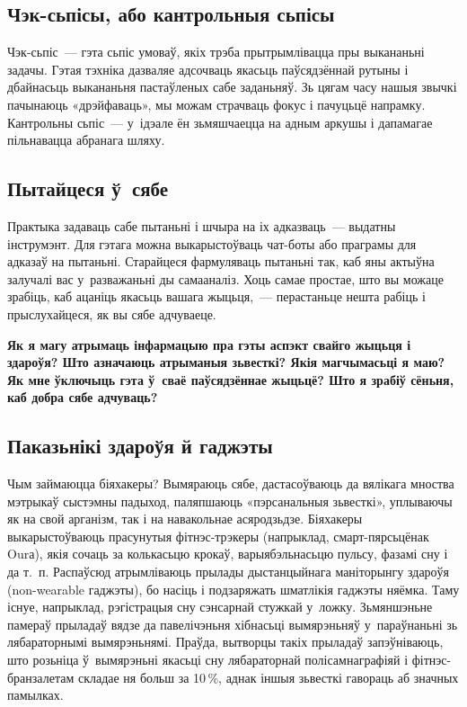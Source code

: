 \subsection*{Чэк-сьпісы, або кантрольныя сьпісы}

Чэк-сьпіс~--- гэта сьпіс умоваў, якіх трэба прытрымлівацца пры выкананьні задачы. Гэтая тэхніка дазваляе адсочваць якасьць паўсядзённай рутыны і дбайнасьць выкананьня пастаўленых сабе заданьняў. Зь цягам часу нашыя звычкі пачынаюць «дрэйфаваць», мы можам страчваць фокус і пачуцьцё напрамку. Кантрольны сьпіс~--- у~ідэале ён зьмяшчаецца на адным аркушы і дапамагае пільнавацца абранага шляху.

\subsection*{Пытайцеся ў~сябе}

Практыка задаваць сабе пытаньні і шчыра на іх адказваць~--- выдатны інструмэнт. Для гэтага можна выкарыстоўваць чат-боты або праграмы для адказаў на пытаньні. Старайцеся фармуляваць пытаньні так, каб яны актыўна залучалі вас у~разважаньні ды самааналіз. Хоць самае простае, што вы можаце зрабіць, каб ацаніць якасьць вашага жыцьця,~--- перастаньце нешта рабіць і прыслухайцеся, як вы сябе адчуваеце. 

\textbf{Як я магу атрымаць інфармацыю пра гэты аспэкт свайго жыцьця і здароўя? Што азначаюць атрыманыя зьвесткі? Якія магчымасьці я маю? Як мне ўключыць гэта ў~сваё паўсядзённае жыцьцё? Што я зрабіў сёньня, каб добра сябе адчуваць?}

\subsection*{Паказьнікі здароўя й гаджэты}

Чым займаюцца біяхакеры? Вымяраюць сябе, дастасоўваюць да вялікага мноства мэтрыкаў сыстэмны падыход, паляпшаюць «пэрсанальныя зьвесткі», уплываючы як на свой арганізм, так і на навакольнае асяродзьдзе. Біяхакеры выкарыстоўваюць прасунутыя фітнэс-трэкеры (напрыклад, смарт-пярсьцёнак Ourа), якія сочаць за колькасьцю крокаў, варыябэльнасьцю пульсу, фазамі сну і да т.~п. Распаўсюд атрымліваюць прылады дыстанцыйнага маніторынгу здароўя (non-wearable гаджэты), бо насіць і подзаряжать шматлікія гаджэты няёмка. Таму існуе, напрыклад, рэгістрацыя сну сэнсарнай стужкай у~ложку. Зьмяншэньне памераў прыладаў вядзе да павелічэньня хібнасьці вымярэньняў у~параўнаньні зь лябараторнымі вымярэньнямі. Праўда, вытворцы такіх прыладаў запэўніваюць, што розьніца ў~вымярэньні якасьці сну лябараторнай полісамнаграфіяй і фітнэс-бранзалетам складае ня больш за 10\,\%, аднак іншыя зьвесткі гавораць аб значных памылках.


